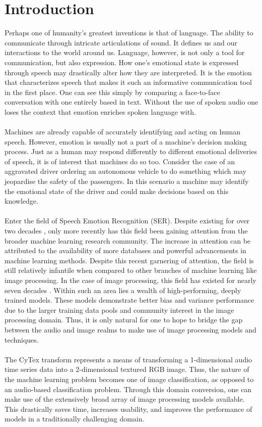 \chapter{Introduction}\label{ch-intro}
Perhaps one of humanity's greatest inventions is that of language. The ability to communicate through intricate articulations of sound. It defines us and our interactions to the world around us. Language, however, is not only a tool for communication, but also expression. How one's emotional state is expressed through speech may drastically alter how they are interpreted. It is the emotion that characterizes speech that makes it such an informative communication tool in the first place. One can see this simply by comparing a face-to-face conversation with one entirely based in text. Without the use of spoken audio one loses the context that emotion enriches spoken language with. \\ \\
Machines are already capable of accurately identifying and acting on human speech. However, emotion is usually not a part of a machine's decision making process. Just as a human may respond differently to different emotional deliveries of speech, it is of interest that machines do so too. Consider the case of an aggravated driver ordering an autonomous vehicle to do something which may jeopardise the safety of the passengers. In this scenario a machine may identify the emotional state of the driver and could make decisions based on this knowledge.\\ \\
Enter the field of Speech Emotion Recognition (SER). Despite existing for over two decades \cite{2decs}, only more recently has this field been gaining attention from the broader machine learning research community. The increase in attention can be attributed to the availability of more databases and powerful advancements in machine learning methods. Despite this recent garnering of attention, the field is still relatively infantile when compared to other branches of machine learning like image processing. In the case of image processing, this field has existed for nearly seven decades \cite{imgprocsurveyOLD}. Within such an area lies a wealth of high-performing, deeply trained models. These models demonstrate better bias and variance performance due to the larger training data pools and community interest in the image processing domain. Thus, it is only natural for one to hope to bridge the gap between the audio and image realms to make use of image processing models and techniques.\\ \\
The CyTex transform represents a means of transforming a 1-dimensional audio time series data into a 2-dimensional textured RGB image. Thus, the nature of the machine learning problem becomes one of image classification, as opposed to an audio-based classification problem. Through this domain conversion, one can make use of the extensively broad array of image processing models available. This drastically saves time, increases usability, and improves the performance of models in a traditionally challenging domain. 


